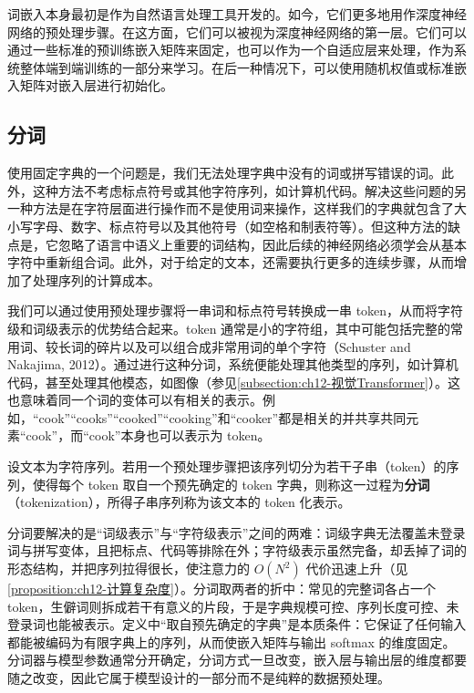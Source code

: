 \documentclass[../../main.tex]{subfiles}
\begin{document}
词嵌入本身最初是作为自然语言处理工具开发的。如今，它们更多地用作深度神经网络的预处理步骤。在这方面，它们可以被视为深度神经网络的第一层。它们可以通过一些标准的预训练嵌入矩阵来固定，也可以作为一个自适应层来处理，作为系统整体端到端训练的一部分来学习。在后一种情况下，可以使用随机权值或标准嵌入矩阵对嵌入层进行初始化。

\subsection{分词}\label{subsection:ch12-分词}

使用固定字典的一个问题是，我们无法处理字典中没有的词或拼写错误的词。此外，这种方法不考虑标点符号或其他字符序列，如计算机代码。解决这些问题的另一种方法是在字符层面进行操作而不是使用词来操作，这样我们的字典就包含了大小写字母、数字、标点符号以及其他符号（如空格和制表符等）。但这种方法的缺点是，它忽略了语言中语义上重要的词结构，因此后续的神经网络必须学会从基本字符中重新组合词。此外，对于给定的文本，还需要执行更多的连续步骤，从而增加了处理序列的计算成本。

我们可以通过使用预处理步骤将一串词和标点符号转换成一串 token，从而将字符级和词级表示的优势结合起来。token 通常是小的字符组，其中可能包括完整的常用词、较长词的碎片以及可以组合成非常用词的单个字符（Schuster and Nakajima, 2012）。通过进行这种分词，系统便能处理其他类型的序列，如计算机代码，甚至处理其他模态，如图像（参见\cref{subsection:ch12-视觉Transformer}）。这也意味着同一个词的变体可以有相关的表示。例如，“cook”“cooks”“cooked”“cooking”和“cooker”都是相关的并共享共同元素“cook”，而“cook”本身也可以表示为 token。

\begin{definition}[分词]\label{definition:ch12-分词}
设文本为字符序列。若用一个预处理步骤把该序列切分为若干子串（token）的序列，使得每个 token 取自一个预先确定的 token 字典，则称这一过程为\textbf{分词}（tokenization），所得子串序列称为该文本的 token 化表示。
\end{definition}

\begin{remark}
分词要解决的是“词级表示”与“字符级表示”之间的两难：词级字典无法覆盖未登录词与拼写变体，且把标点、代码等排除在外；字符级表示虽然完备，却丢掉了词的形态结构，并把序列拉得很长，使注意力的 $O(N^2)$ 代价迅速上升（见\cref{proposition:ch12-计算复杂度}）。分词取两者的折中：常见的完整词各占一个 token，生僻词则拆成若干有意义的片段，于是字典规模可控、序列长度可控、未登录词也能被表示。定义中“取自预先确定的字典”是本质条件：它保证了任何输入都能被编码为有限字典上的序列，从而使嵌入矩阵与输出 softmax 的维度固定。分词器与模型参数通常分开确定，分词方式一旦改变，嵌入层与输出层的维度都要随之改变，因此它属于模型设计的一部分而不是纯粹的数据预处理。
\end{remark}
\end{document}
